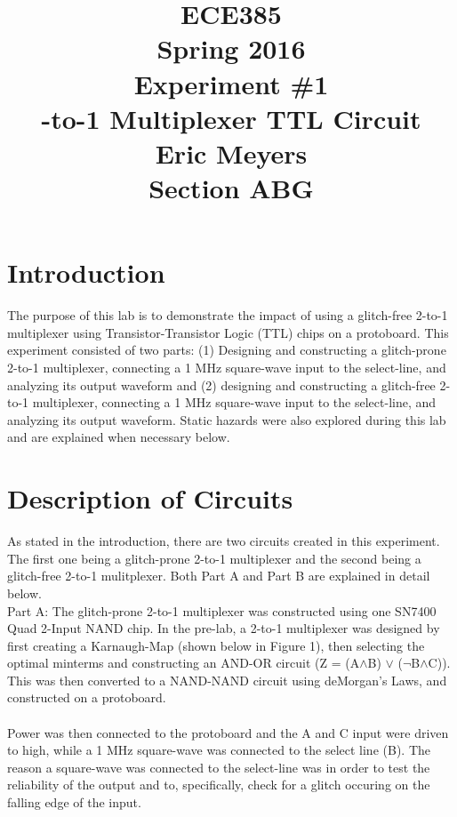 \documentclass{scrartcl}
\begin{document}
\title { {ECE385} \\
		{\large \normalfont Spring 2016} \\
		{\large \normalfont Experiment \#1 } \\
		\vspace{60mm}
		{\large {}-to-1 Multiplexer TTL Circuit} \\
		\vspace{60mm}
		{\large \normalfont Eric Meyers} \\
		{\large \normalfont Section ABG} 
		\vfill
	}

	
\clearpage
\maketitle
\thispagestyle{empty}
\newpage

\section{Introduction}
The purpose of this lab is to demonstrate the impact of using a glitch-free 2-to-1 multiplexer using Transistor-Transistor Logic (TTL) chips on a protoboard. This experiment consisted of two parts: (1) Designing and constructing a glitch-prone 2-to-1 multiplexer, connecting a 1 MHz square-wave input to the select-line, and analyzing its output waveform and (2) designing and constructing a glitch-free 2-to-1 multiplexer, connecting a 1 MHz square-wave input to the select-line, and analyzing its output waveform. Static hazards were also explored during this lab and are explained when necessary below.  

 \section{Description of Circuits}
As stated in the introduction, there are two circuits created in this experiment. The first one being a glitch-prone 2-to-1 multiplexer and the second being a glitch-free 2-to-1 mulitplexer. Both Part A and Part B are explained in detail below. \\

Part A: The glitch-prone 2-to-1 multiplexer was constructed using one SN7400 Quad 2-Input NAND chip. In the pre-lab, a 2-to-1 multiplexer was designed by first creating a Karnaugh-Map (shown below in Figure 1), then selecting the optimal minterms and constructing an AND-OR circuit (Z =  (A$\land$B) $\lor$ ($\neg$B$\land$C)). This was then converted to a NAND-NAND circuit using deMorgan's Laws, and constructed on a protoboard. \\\\Power was then connected to the protoboard and the A and C input were driven to high, while a 1 MHz square-wave was connected to the select line (B). The reason a square-wave was connected to the select-line was in order to test the reliability of the output and to, specifically, check for a glitch occuring on the falling edge of the input. 
\end{document}
